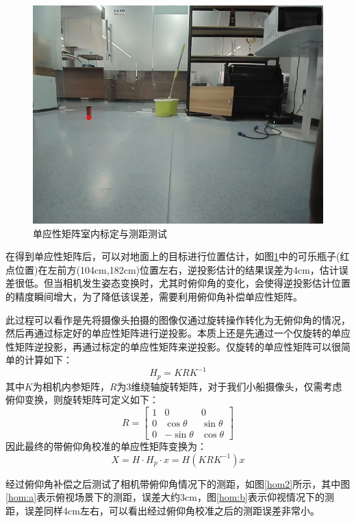 \documentclass[cn,12pt,color=mine,scheme=chinese,bibstyle=gb7714-2015]{elegantbook}
\begin{document}
\begin{figure}[h]
	\centering
	\includegraphics[width=.65\linewidth]{images/hom}
	\caption{单应性矩阵室内标定与测距测试}
	\label{hom}
\end{figure}

\begin{note}[俯仰角校准]
	在得到单应性矩阵后，可以对地面上的目标进行位置估计，如图\ref{hom}中的可乐瓶子(红点位置)在左前方(104cm,182cm)位置左右，逆投影估计的结果误差为4cm，估计误差很低。但当相机发生姿态变换时，尤其时俯仰角的变化，会使得逆投影估计位置的精度瞬间增大，为了降低该误差，需要利用俯仰角补偿单应性矩阵。
	
	此过程可以看作是先将摄像头拍摄的图像仅通过旋转操作转化为无俯仰角的情况，然后再通过标定好的单应性矩阵进行逆投影。本质上还是先通过一个仅旋转的单应性矩阵逆投影，再通过标定的单应性矩阵来逆投影。仅旋转的单应性矩阵可以很简单的计算如下：
	\begin{equation}
		H_p=KRK^{-1}
	\end{equation}
	其中$K$为相机内参矩阵，$R$为3维绕轴旋转矩阵，对于我们小船摄像头，仅需考虑俯仰变换，则旋转矩阵可定义如下：
	\begin{equation}
		R=\left[
		\begin{array}{ccc}
			1 & 0 & 0 \\
			0 & \cos \theta & \sin \theta \\
			0 & -\sin \theta & \cos \theta
		\end{array}
		\right]
	\end{equation}
	因此最终的带俯仰角校准的单应性矩阵变换为：
	\begin{equation}
		X=H\cdot H_p\cdot x=H(KRK^{-1})x
	\end{equation}
	
	经过俯仰角补偿之后测试了相机带俯仰角情况下的测距，如图\ref{hom2}所示，其中图\ref{hom:a}表示俯视场景下的测距，误差大约3cm，图\ref{hom:b}表示仰视情况下的测距，误差同样4cm左右，可以看出经过俯仰角校准之后的测距误差非常小。
\end{note}
\end{document}
